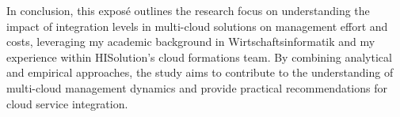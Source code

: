 In conclusion, this exposé outlines the research focus on understanding the impact of integration levels in multi-cloud solutions on management effort and costs, 
leveraging my academic background in Wirtschaftsinformatik and my experience within HISolution's cloud formations team. 
By combining analytical and empirical approaches, 
the study aims to contribute to the understanding of multi-cloud management dynamics and provide practical recommendations for cloud service integration.